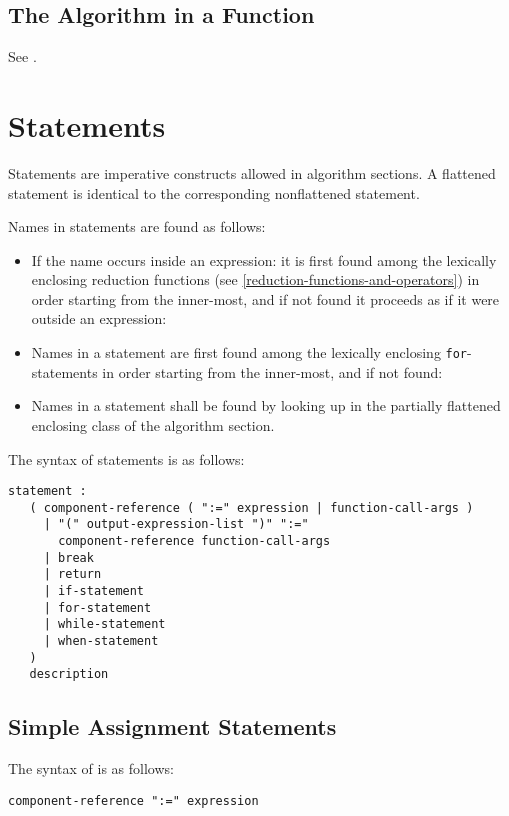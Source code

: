 \subsection{The Algorithm in a Function}\label{execution-of-the-algorithm-in-a-function}\label{the-algorithm-in-a-function}

See .

\section{Statements}\label{statements}

Statements are imperative constructs allowed in algorithm sections.
A flattened statement is identical to the corresponding nonflattened statement.

Names in statements are found as follows:
\begin{itemize}
\item
  If the name occurs inside an expression: it is first found among the lexically enclosing reduction functions (see \cref{reduction-functions-and-operators}) in order starting from the inner-most, and if not found it proceeds as if it were outside an expression:
\item
  Names in a statement are first found among the lexically enclosing \lstinline!for!-statements in order starting from the inner-most, and if not found:
\item
  Names in a statement shall be found by looking up in the partially flattened enclosing class of the algorithm section.
\end{itemize}

The syntax of statements is as follows:
\begin{lstlisting}[language=grammar]
statement :
   ( component-reference ( ":=" expression | function-call-args )
     | "(" output-expression-list ")" ":="
       component-reference function-call-args
     | break
     | return
     | if-statement
     | for-statement
     | while-statement
     | when-statement
   )
   description
\end{lstlisting}

\subsection{Simple Assignment Statements}\label{simple-assignment-statements}

The syntax of  is as follows:
\begin{lstlisting}[language=grammar]
component-reference ":=" expression
\end{lstlisting}

